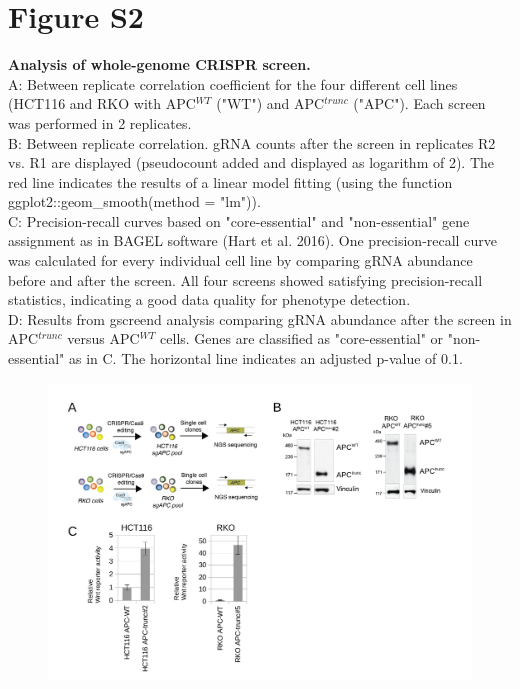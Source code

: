\documentclass[11pt,a4paper,titlepage]{article}
\begin{document}
\pagebreak
\section*{Figure S2}

\textbf{Analysis of whole-genome CRISPR screen.}\\
A: Between replicate correlation coefficient for the four different cell lines (HCT116 and RKO with APC$^{WT}$ ("WT") and APC$^{trunc}$ ("APC"). Each screen was performed in 2 replicates. \\
B: Between replicate correlation. gRNA counts after the screen in replicates R2 vs. R1 are displayed (pseudocount added and displayed as logarithm of 2). The red line indicates the results of a linear model fitting (using the function ggplot2::geom\_smooth(method = "lm")). \\
C: Precision-recall curves based on "core-essential" and "non-essential" gene assignment as in BAGEL software (Hart et al. 2016). One precision-recall curve was calculated for every individual cell line by comparing gRNA abundance before and after the screen. All four screens showed satisfying precision-recall statistics, indicating a good data quality for phenotype detection.\\
D: Results from gscreend analysis comparing gRNA abundance after the screen in APC$^{trunc}$ versus APC$^{WT}$ cells. Genes are classified as "core-essential" or "non-essential" as in C. The horizontal line indicates an adjusted p-value of 0.1.\\

\begin{figure}[h]
\includegraphics[scale=0.7]{FigureS2.pdf} 
\end{figure}
\end{document}
